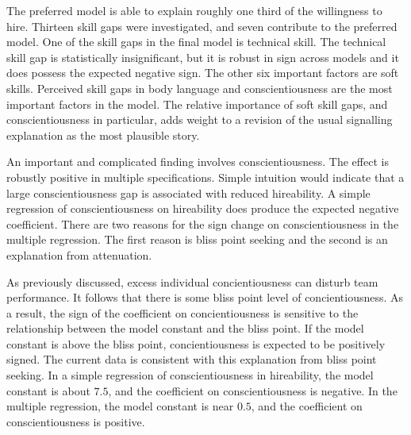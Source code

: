 \documentclass[review]{elsarticle}
\begin{document}
The preferred model is able to explain roughly one third of the willingness to hire.
Thirteen skill gaps were investigated, and seven contribute to the preferred model.
One of the skill gaps in the final model is technical skill.
The technical skill gap is statistically insignificant, but it is robust in sign across models and it does possess the expected negative sign.
The other six important factors are soft skills.
Perceived skill gaps in body language and conscientiousness are the most important factors in the model.
The relative importance of soft skill gaps, and conscientiousness in particular, adds weight to a revision of the usual signalling explanation as the most plausible story.

An important and complicated finding involves conscientiousness.
The effect is robustly positive in multiple specifications.
Simple intuition would indicate that a large conscientiousness gap is associated with reduced hireability.
A simple regression of conscientiousness on hireability does produce the expected negative coefficient.
There are two reasons for the sign change on conscientiousness in the multiple regression.
The first reason is bliss point seeking and the second is an explanation from attenuation.

As previously discussed, excess individual concientiousness can disturb team performance\cite{curcseu2019personality}.
It follows that there is some bliss point level of concientiousness.
As a result, the sign of the coefficient on concientiousness is sensitive to the relationship between the model constant and the bliss point.
If the model constant is above the bliss point, concientiousness is expected to be positively signed.
The current data is consistent with this explanation from bliss point seeking.
In a simple regression of conscientiousness in hireability, the model constant is about $7.5$, and the coefficient on conscientiousness is negative.
In the multiple regression, the model constant is near $0.5$, and the coefficient on conscientiousness is positive.

\end{document}
